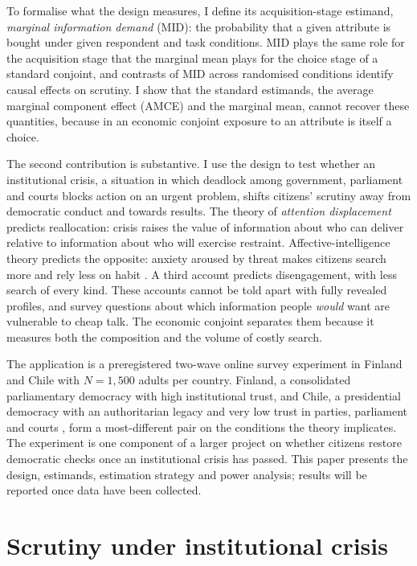 \documentclass[11pt]{article}
\begin{document}
To formalise what the design measures, I define its acquisition-stage estimand, \emph{marginal information demand} (MID): the probability that a given attribute is bought under given respondent and task conditions. MID plays the same role for the acquisition stage that the marginal mean \parencite{Leeper2020a} plays for the choice stage of a standard conjoint, and contrasts of MID across randomised conditions identify causal effects on scrutiny. I show that the standard estimands, the average marginal component effect (AMCE) and the marginal mean, cannot recover these quantities, because in an economic conjoint exposure to an attribute is itself a choice.

The second contribution is substantive. I use the design to test whether an institutional crisis, a situation in which deadlock among government, parliament and courts blocks action on an urgent problem, shifts citizens' scrutiny away from democratic conduct and towards results. The theory of \emph{attention displacement} predicts reallocation: crisis raises the value of information about who can deliver relative to information about who will exercise restraint. Affective-intelligence theory predicts the opposite: anxiety aroused by threat makes citizens search more and rely less on habit \parencite{MarcusNeumanMacKuen2000,ValentinoEtAl2008}. A third account predicts disengagement, with less search of every kind. These accounts cannot be told apart with fully revealed profiles, and survey questions about which information people \emph{would} want are vulnerable to cheap talk. The economic conjoint separates them because it measures both the composition and the volume of costly search.

The application is a preregistered two-wave online survey experiment in Finland and Chile with $N=1{,}500$ adults per country. Finland, a consolidated parliamentary democracy with high institutional trust, and Chile, a presidential democracy with an authoritarian legacy and very low trust in parties, parliament and courts \parencite{OECD2026Trust}, form a most-different pair on the conditions the theory implicates. The experiment is one component of a larger project on whether citizens restore democratic checks once an institutional crisis has passed. This paper presents the design, estimands, estimation strategy and power analysis; results will be reported once data have been collected.

\section{Scrutiny under institutional crisis}
\end{document}

